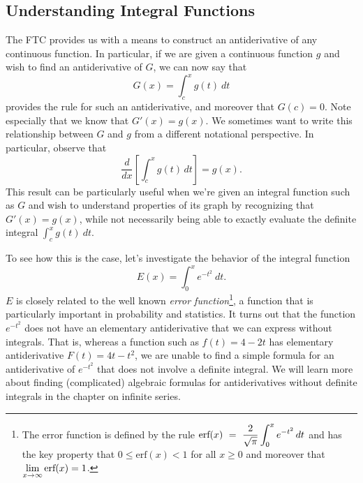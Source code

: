 


\subsection*{Understanding Integral Functions}%

The FTC provides us with a means to construct an antiderivative of any continuous function.  In particular, if we are given a continuous function $g$ and wish to find an antiderivative of $G$, we can now say that 
\[ G(x) = \int_c^x g(t) \ dt \]
provides the rule for such an antiderivative, and moreover that $G(c) = 0$.  Note especially that we know that $G'(x) = g(x)$.  We sometimes want to write this relationship between $G$ and $g$ from a different notational perspective.  In particular, observe that
\begin{equation} \label{E:diffint}
\frac{d}{dx} \left[ \int_c^x g(t) \, dt \right] = g(x).
\end{equation}
This result can be particularly useful when we're given an integral function such as $G$ and wish to understand properties of its graph by recognizing that $G'(x) = g(x)$, while not necessarily being able to exactly evaluate the definite integral $\int_c^x g(t) \ dt$.  

To see how this is the case, let's investigate the behavior of the integral function 
\[ E(x) = \int_0^x e^{-t^2} \ dt. \]
$E$ is closely related to the well known \emph{error function}\footnote{The error function is defined by the rule $\displaystyle \mbox{erf}(x)~=~\frac{2}{\sqrt{\pi}} \int_0^x e^{-t^2} \,dt$ and has the key property that $0 \le \mbox{erf}(x) < 1$ for all $x \ge 0$ and moreover that $\displaystyle \lim_{x \to \infty} \mbox{erf}(x) = 1$.}, a function that is particularly important in probability and statistics.  It turns out that the function $e^{-t^2}$ does not have an elementary antiderivative that we can express without integrals.  That is, whereas a function such as $f(t) = 4-2t$ has elementary antiderivative $F(t) = 4t - t^2$, we are unable to find a simple formula for an antiderivative of $e^{-t^2}$ that does not involve a definite integral.  We will learn more about finding (complicated) algebraic formulas for antiderivatives without definite integrals in the chapter on infinite series.

